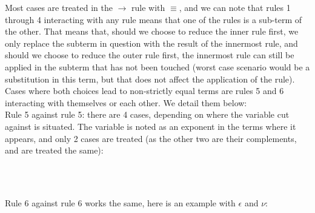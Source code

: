 \begin{myproof}
Most cases are treated in the $\to$ rule with $\equiv$, and we can note that rules 1 through 4 interacting with any rule means that one of the rules is a sub-term of the other. That means that, should we choose to reduce the inner rule first, we only replace the subterm in question with the result of the innermost rule, and should we choose to reduce the outer rule first, the innermost rule can still be applied in the subterm that has not been touched (worst case scenario would be a substitution in this term, but that does not affect the application of the rule). Cases where both choices lead to non-strictly equal terms are rules 5 and 6 interacting with themselves or each other. We detail them below:\\
Rule 5 against rule 5: there are 4 cases, depending on where the variable cut against is situated. The variable is noted as an exponent in the terms where it appears, and only 2 cases are treated (as the other two are their complements, and are treated the same):\\
\\
\\
Rule 6 against rule 6 works the same, here is an example with $\epsilon$ and $\nu$:\\
\end{myproof}
